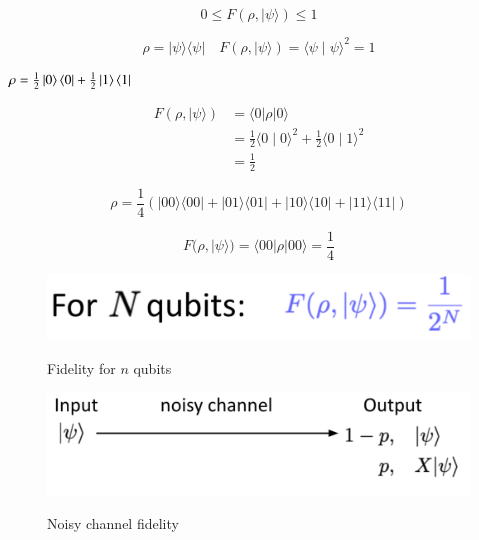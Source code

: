 \begin{equation}
0 \leq F(\rho,|\psi\rangle) \leq 1
\end{equation}

\begin{equation}
\rho=|\psi\rangle\langle\psi| \quad F(\rho,|\psi\rangle)=\langle\psi \mid \psi\rangle^{2}=1
\end{equation}

$\rho= \frac{1}{2}\ket{0}\bra{0} + \frac{1}{2}\ket{1}\bra{1}$

\begin{equation}
\begin{aligned}
F(\rho,|\psi\rangle) &=\langle 0|\rho| 0\rangle \\
&=\frac{1}{2}\langle 0 \mid 0\rangle^{2}+\frac{1}{2}\langle 0 \mid 1\rangle^{2} \\
&=\frac{1}{2}
\end{aligned}
\end{equation}

\begin{equation}
\rho=\frac{1}{4}(|00\rangle\langle 00|+| 01\rangle\langle 01|+| 10\rangle\langle 10|+| 11\rangle\langle 11|)
\end{equation}

\begin{equation}
F(\rho,|\psi\rangle)=\langle 00|\rho| 00\rangle=\frac{1}{4}
\end{equation}

\begin{figure}[H]
    \centering
    \includegraphics[width=1.0\textwidth]{lesson3/N_qubits_relation.pdf}
    \label{fig: 1}
    \begin{center}
        \caption{Fidelity for $n$ qubits}
    \end{center}
\end{figure}

\begin{figure}[H]
    \centering
    \includegraphics[width=1.0\textwidth]{lesson3/noisy_channel_ex.pdf}
    \label{fig: 1}
    \begin{center}
        \caption{Noisy channel fidelity}
    \end{center}
\end{figure}

